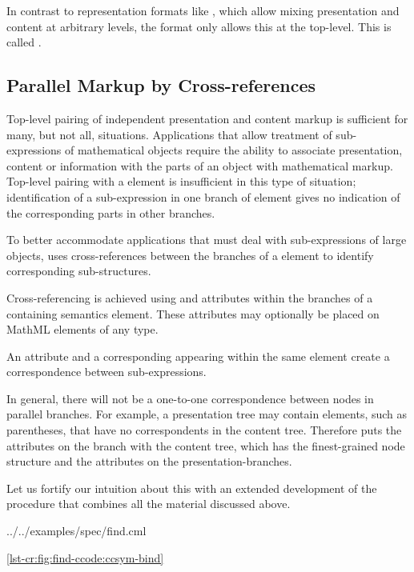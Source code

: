 In contrast to representation formats like {\mathml}, which allow mixing
presentation and content at arbitrary levels, the {\codeml} format only allows
this at the top-level.  This is called {}.

\subsection{Parallel Markup by Cross-references}

Top-level pairing of independent presentation and content markup is sufficient for
many, but not all, situations. Applications that allow treatment of
sub-expressions of mathematical objects require the ability to associate
presentation, content or information with the parts of an object with mathematical
markup. Top-level pairing with a {} element is insufficient in
this type of situation; identification of a sub-expression in one branch of
{} element gives no indication of the corresponding parts in
other branches.
  
To better accommodate applications that must deal with sub-expressions of large
objects, {\codeml} uses cross-references between the branches of a
{} element to identify corresponding sub-structures.

Cross-referencing is achieved using {} and
{} attributes within the branches of a
containing semantics element. These attributes may optionally be placed on MathML
elements of any type.

An {} attribute and a corresponding
{} appearing within the same
{} element create a correspondence between sub-expressions.
  
In general, there will not be a one-to-one correspondence between nodes in
parallel branches. For example, a presentation tree may contain elements, such as
parentheses, that have no correspondents in the content tree. Therefore {\codeml}
puts the {} attributes on the branch with the content
tree, which has the finest-grained node structure and the
{} attributes on the presentation-branches.  

Let us fortify our intuition about this with an extended development of the
{} procedure that combines all the material discussed above.

\def\boxit#1{\fbox{#1}}
{\scriptsize
{../../examples/spec/find.cml}}

\ref{lst-cr:fig:find-ccode:ccsym-bind}
